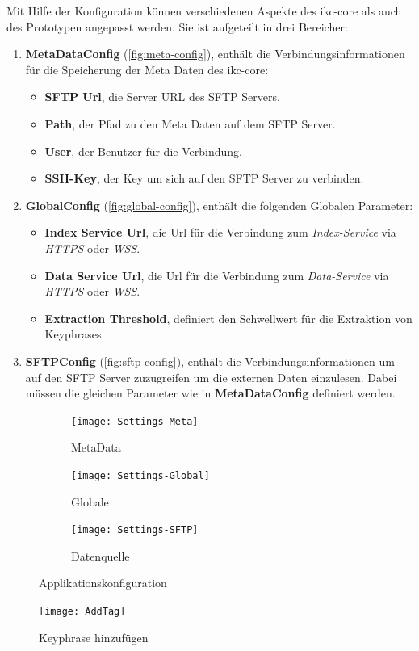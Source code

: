 Mit Hilfe der Konfiguration können verschiedenen Aspekte des \gls{ikc-core} als auch des Prototypen angepasst werden. Sie ist aufgeteilt in drei Bereicher:
\begin{enumerate}
    \item \textbf{MetaDataConfig} (\autoref{fig:meta-config}), enthält die Verbindungsinformationen für die Speicherung der Meta Daten des \gls{ikc-core}:
    \begin{itemize}
        \item \textbf{SFTP Url}, die Server URL des SFTP Servers.
        \item \textbf{Path}, der Pfad zu den Meta Daten auf dem SFTP Server.
        \item \textbf{User}, der Benutzer für die Verbindung.
        \item \textbf{SSH-Key}, der Key um sich auf den SFTP Server zu verbinden. 
    \end{itemize}
    \item \textbf{GlobalConfig} (\autoref{fig:global-config}), enthält die folgenden Globalen Parameter:
    \begin{itemize}
        \item \textbf{Index Service Url}, die Url für die Verbindung zum \textit{Index-Service} via \textit{HTTPS} oder \textit{WSS}.
        \item \textbf{Data Service Url}, die Url für die Verbindung zum \textit{Data-Service} via \textit{HTTPS} oder \textit{WSS}.
        \item \textbf{Extraction Threshold}, definiert den Schwellwert für die Extraktion von Keyphrases.
    \end{itemize}
    \item \textbf{SFTPConfig} (\autoref{fig:sftp-config}), enthält die Verbindungsinformationen um auf den SFTP Server zuzugreifen um die externen Daten einzulesen. Dabei müssen die gleichen Parameter wie in \textbf{MetaDataConfig} definiert werden.
\end{enumerate}

\newpage
\begin{landscape}

\begin{figure}[htbp]
    \centering
    \begin{subfigure}[b]{0.5\textwidth}
    \texttt{[image: Settings-Meta]}
    \caption{MetaData}
    \label{fig:meta-config}
    \end{subfigure}
     \begin{subfigure}[b]{0.5\textwidth}
    \texttt{[image: Settings-Global]}
    \caption{Globale}
    \label{fig:global-config}
    \end{subfigure}
     \begin{subfigure}[b]{0.5\textwidth}
    \texttt{[image: Settings-SFTP]}
    \caption{Datenquelle}
    \label{fig:sftp-config}
    \end{subfigure}
    \caption{Applikationskonfiguration}
\end{figure}
\end{landscape}
\newpage
\begin{figure}[ht]
\centering
\texttt{[image: AddTag]}
\caption{Keyphrase hinzufügen}
\label{fig:addtag}
\end{figure}

